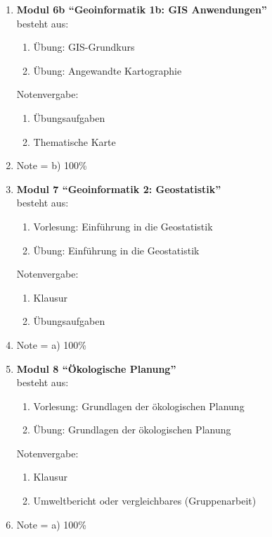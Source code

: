 \begin{enumerate}
 \item \textbf{Modul 6b ``Geoinformatik 1b: GIS Anwendungen''}  \\ besteht aus:
  \begin{enumerate}
   \item Übung: GIS-Grundkurs
   \item Übung: Angewandte Kartographie
  \end{enumerate}
  Notenvergabe:
  \begin{enumerate}
   \item Übungsaufgaben
   \item Thematische Karte
  \end{enumerate}
  \item[] Note = b) 100\%
    
 \item \textbf{Modul 7 ``Geoinformatik 2: Geostatistik''}  \\ besteht aus:
  \begin{enumerate}
   \item Vorlesung: Einführung in die Geostatistik
   \item Übung: Einführung in die Geostatistik
  \end{enumerate}
  Notenvergabe:
  \begin{enumerate}
   \item Klausur
   \item Übungsaufgaben
  \end{enumerate}
  \item[] Note = a) 100\%

 \item \textbf{Modul 8 ``Ökologische Planung''}  \\ besteht aus:
  \begin{enumerate}
   \item Vorlesung: Grundlagen der ökologischen Planung
   \item Übung: Grundlagen der ökologischen Planung
  \end{enumerate}
  Notenvergabe:
  \begin{enumerate}
   \item Klausur
   \item Umweltbericht oder vergleichbares (Gruppenarbeit)
  \end{enumerate}
   \item[] Note = a) 100\%


\end{enumerate}
